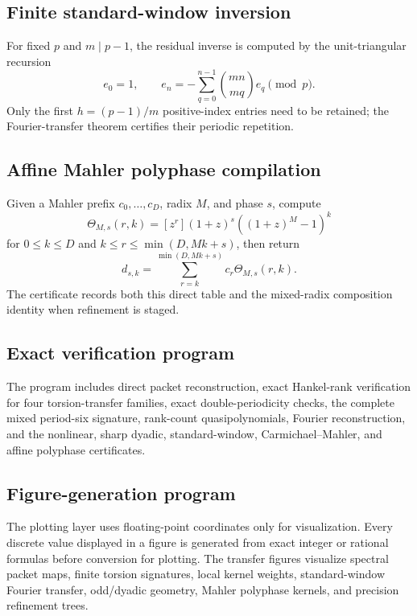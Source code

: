 \documentclass[11pt]{article}
\theoremstyle{definition}\newtheorem{definition}[theorem]{Definition}\newtheorem{example}[theorem]{Example}\newtheorem{construction}[theorem]{Construction}\newtheorem{algorithm}[theorem]{Algorithm}\newtheorem{conjecture}[theorem]{Conjecture}\newtheorem{problem}[theorem]{Problem}
\theoremstyle{remark}\newtheorem{remark}[theorem]{Remark}\newtheorem{boundary}[theorem]{Boundary}\newtheorem{certificate}[theorem]{Computational Certificate}\newtheorem{classical}[theorem]{Classical Input}\newtheorem{principle}[theorem]{Structural Principle}
\begin{document}
\subsection{Finite standard-window inversion}
For fixed $p$ and $m\mid p-1$, the residual inverse is computed by the unit-triangular recursion
\[
 e_0=1,
 \qquad
 e_n=-\sum_{q=0}^{n-1}\binom{mn}{mq}e_q\pmod p.
\]
Only the first $h=(p-1)/m$ positive-index entries need to be retained; the Fourier-transfer theorem certifies their periodic repetition.

\subsection{Affine Mahler polyphase compilation}
Given a Mahler prefix $c_0,\ldots,c_D$, radix $M$, and phase $s$, compute
\[
 \Theta_{M,s}(r,k)=[z^r](1+z)^s((1+z)^M-1)^k
\]
for $0\leq k\leq D$ and $k\leq r\leq\min(D,Mk+s)$, then return
\[
 d_{s,k}=\sum_{r=k}^{\min(D,Mk+s)}c_r\Theta_{M,s}(r,k).
\]
The certificate records both this direct table and the mixed-radix composition identity when refinement is staged.

\subsection{Exact verification program}
The program includes direct packet reconstruction, exact Hankel-rank verification for four torsion-transfer families, exact double-periodicity checks, the complete mixed period-six signature, rank-count quasipolynomials, Fourier reconstruction, and the nonlinear, sharp dyadic, standard-window, Carmichael--Mahler, and affine polyphase certificates.



\subsection{Figure-generation program}
The plotting layer uses floating-point coordinates only for visualization.  Every discrete value displayed in a figure is generated from exact integer or rational formulas before conversion for plotting.  The transfer figures visualize spectral packet maps, finite torsion signatures, local kernel weights, standard-window Fourier transfer, odd/dyadic geometry, Mahler polyphase kernels, and precision refinement trees.


\end{document}
